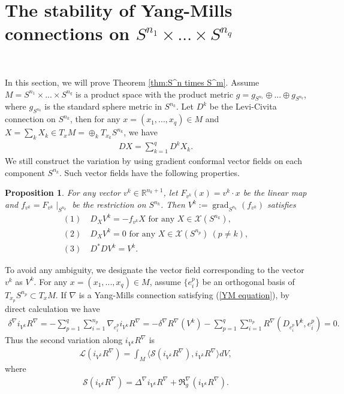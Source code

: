 \documentclass{amsart}
\newtheorem{proposition}{Proposition}[section]
\begin{document}
	\section{The stability of Yang-Mills connections on $S^{n_1}\times...\times S^{n_q}$}\ 
	
	In this section, we will prove Theorem \ref{thm:S^n times S^m}. Assume $M=S^{n_1}\times...\times S^{n_q}$ is a product space with the product metric $g=g_{S^{n_1}}\oplus...\oplus g_{S^{n_q}}$, where $g_{S^{n_k}}$ is the standard sphere metric in $S^{n_k}$. Let $D^k$ be the Levi-Civita connection on $S^{n_k}$, then for any $x=(x_1,...,x_q)\in M$ and $X=\sum_kX_k\in T_xM=\oplus_k T_{x_k}S^{n_k}$, we have
	\begin{align*}
		DX=\sum_{k=1}^qD^kX_k.
	\end{align*}
	We still construct the variation by using gradient conformal vector fields on each component $S^{n_k}$. Such vector fields have the following properties.
	\begin{proposition}
		For any vector $v^k\in\mathbb{R}^{n_k+1}$, let $F_{v^k}(x)=v^k\cdot x$ be the linear map and $f_{v^k}=F_{v^k}\mid_{S^{n_k}}$ be the restriction on $S^{n_k}$. Then $V^k:=\operatorname{grad}_{S^{n_k}}(f_{v^k})$ satisfies
		\begin{align*}
			(1)\ &D_XV^k=-f_{v^k}X\textrm{ for any }X\in\mathscr{X}(S^{n_k}),\\
			(2)\ &D_XV^k=0\textrm{ for any }X\in\mathscr{X}(S^{n_p})\ (p\ne k),\\
			(3)\ &D^\ast DV^k=V^k.
		\end{align*}
	\end{proposition}
	To avoid any ambiguity, we designate the vector field corresponding to the vector $v^k$ as $V^k$. For any $x=(x_1,...,x_q)\in M$, assume $\{e_i^p\}$ be an orthogonal basis of $T_{x_p}S^{n_p}\subset T_xM$. If $\nabla$ is a Yang-Mills connection satisfying (\ref{YM equation}), by direct calculation we have
	\begin{align*}
		\delta^\nabla i_{V^k}R^\nabla=-\sum_{p=1}^q\sum_{i=1}^{n_p}\nabla_{e_i^p}i_{V^k}R^\nabla=-\delta^\nabla R^\nabla(V^k)-\sum_{p=1}^q\sum_{i=1}^{n_p}R^\nabla(D_{e_i^p}V^k,e_i^p)=0.
	\end{align*}
	Thus the second variation along $i_{V^k}R^\nabla$ is
	\begin{align*}
		\mathscr{L}(i_{V^k}R^\nabla)=\int_M\langle\mathscr{S}(i_{V^k}R^\nabla),i_{V^k}R^\nabla\rangle dV,
	\end{align*}
	where
	\begin{align*}
		\mathscr{S}(i_{V^k}R^\nabla)=\Delta^\nabla i_{V^k}R^\nabla+\mathfrak{R}^\nabla_g(i_{V^k}R^\nabla).
	\end{align*}
\end{document}

